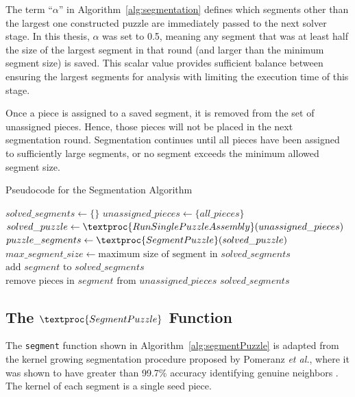 The term ``\textit{$\alpha$}'' in Algorithm~\ref{alg:segmentation} defines which segments other than the largest one constructed puzzle are immediately passed to the next solver stage.  In this thesis, \textit{$\alpha$} was set to 0.5, meaning any segment that was at least half the size of the largest segment in that round (and larger than the minimum segment size) is saved.  This scalar value provides sufficient balance between ensuring the largest segments for analysis with limiting the execution time of this stage.

Once a piece is assigned to a saved segment, it is removed from the set of unassigned pieces.  Hence, those pieces will not be placed in the next segmentation round.  Segmentation continues until all pieces have been assigned to sufficiently large segments, or no segment exceeds the minimum allowed segment size.

\begin{algorithm}
\caption{Pseudocode for the Segmentation Algorithm}\label{alg:segmentation}
\begin{algorithmic}[1]
    \State $\textit{solved\_segments} \gets \{ \}$
    \State $unassigned\_pieces \gets \{ \textit{all\_pieces} \}$
    \Repeat
        \State $solved\_puzzle \gets \textproc{RunSinglePuzzleAssembly}(unassigned\_pieces)$
        \State $puzzle\_segments \gets \textproc{SegmentPuzzle}(solved\_puzzle\text)$
        \State $max\_segment\_size \gets \text{maximum size of segment in } solved\_segments$
                \State $\text{add } segment \text{ to } solved\_segments$
                \State $\text{remove pieces in } segment \text{ from } unassigned\_pieces$
            \EndIf
        \EndFor
    \State \Return $solved\_segments$
\EndFunction
\end{algorithmic}
\end{algorithm}

\subsection{The $\textproc{SegmentPuzzle}$ Function}\label{sec:segmentPuzzle}

The \texttt{segment} function shown in Algorithm~\ref{alg:segmentPuzzle} is adapted from the kernel growing segmentation procedure proposed by Pomeranz \textit{et al.}, where it was shown to have greater than 99.7\% accuracy identifying genuine neighbors \cite{pomeranz2011}. The kernel of each segment is a single seed piece.

